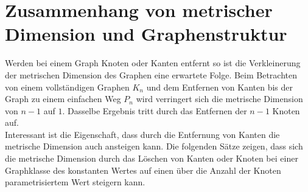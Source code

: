 \section{Zusammenhang von metrischer Dimension und Graphenstruktur}
Werden bei einem Graph Knoten oder Kanten entfernt so ist die Verkleinerung der metrischen Dimension des Graphen eine erwartete Folge. Beim Betrachten von einem vollständigen Graphen $K_n$ und dem Entfernen von Kanten bis der Graph zu einem einfachen Weg $P_n$ wird verringert sich die metrische Dimension von $n-1$ auf $1$. Dasselbe Ergebnis tritt durch das Entfernen der $n-1$ Knoten auf.\\Interessant ist die Eigenschaft, dass durch die Entfernung von Kanten die metrische Dimension auch ansteigen kann. Die folgenden Sätze zeigen, dass sich die metrische Dimension durch das Löschen von Kanten oder Knoten bei einer Graphklasse des konstanten Wertes auf einen über die Anzahl der Knoten parametrisiertem Wert steigern kann.
